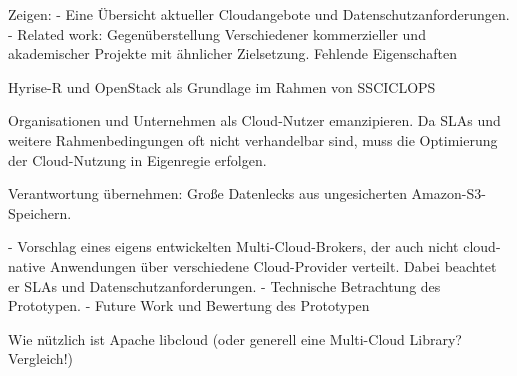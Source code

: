 Zeigen: 
- Eine Übersicht aktueller Cloudangebote und Datenschutzanforderungen.
- Related work: Gegenüberstellung Verschiedener kommerzieller und akademischer Projekte mit ähnlicher Zielsetzung. Fehlende Eigenschaften

Hyrise-R und OpenStack als Grundlage im Rahmen von SSCICLOPS

Organisationen und Unternehmen als Cloud-Nutzer emanzipieren. Da SLAs und weitere Rahmenbedingungen oft nicht verhandelbar sind, muss die Optimierung der Cloud-Nutzung in Eigenregie erfolgen.

Verantwortung übernehmen: Große Datenlecks aus ungesicherten Amazon-S3-Speichern.

- Vorschlag eines eigens entwickelten Multi-Cloud-Brokers, der auch nicht cloud-native Anwendungen über verschiedene Cloud-Provider verteilt. Dabei beachtet er SLAs und Datenschutzanforderungen.
- Technische Betrachtung des Prototypen.
- Future Work und Bewertung des Prototypen

Wie nützlich ist Apache libcloud (oder generell eine Multi-Cloud Library? Vergleich!)